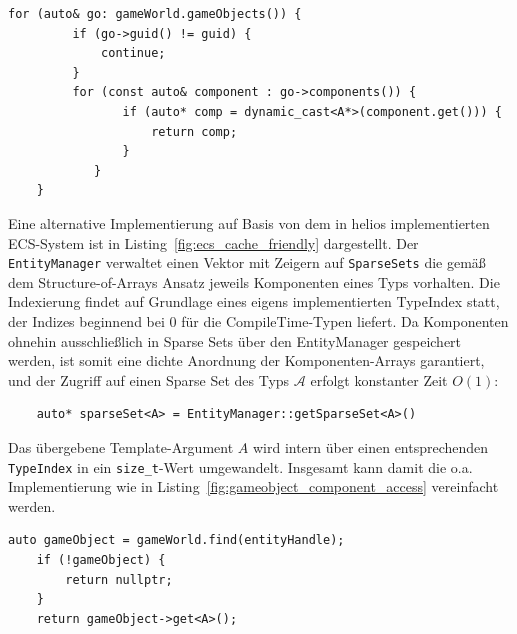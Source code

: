 \begin{lstlisting}[style=c++style,
    caption={Codebeispiel für die Iteration über alle GameObjects, um Komponenten eines bestimmten Typs $\mathcal{A}$ zu finden (Meilenstein 3). Die Implementierung begünstigt Cache Misses, da die angefragten Daten nicht in zusammenhängenden Speicherbereichen liegen.
Für den performancekritischen Hot Path in GameEngines entstehen zudem durch das \textit{Pointer Chasing} \texttt{world} $\rightarrow$ \texttt{gameobject} $\rightarrow$ \texttt{component}~\cite{HKSN+16} und den RTTI-cast unverhältnismäßig teure Operationen.},
    label=lst:gameobject_cache_miss]
    for (auto& go: gameWorld.gameObjects()) {
         if (go->guid() != guid) {
             continue;
         }
         for (const auto& component : go->components()) {
                if (auto* comp = dynamic_cast<A*>(component.get())) {
                    return comp;
                }
            }
    }
\end{lstlisting}

Eine alternative Implementierung auf Basis von dem in helios implementierten ECS-System ist in Listing~\ref{fig:ecs_cache_friendly} dargestellt.
Der \texttt{EntityManager} verwaltet einen Vektor mit Zeigern auf \texttt{SparseSets} die gemäß dem Structure-of-Arrays Ansatz jeweils Komponenten eines Typs vorhalten.
Die Indexierung findet auf Grundlage eines eigens implementierten TypeIndex statt, der Indizes beginnend bei $0$ für die CompileTime-Typen liefert.
Da Komponenten ohnehin ausschließlich in Sparse Sets über den EntityManager gespeichert werden, ist somit eine dichte Anordnung der Komponenten-Arrays garantiert, und der Zugriff auf einen Sparse Set des Typs $\mathcal{A}$ erfolgt konstanter Zeit $O(1)$:

\begin{verbatim}
    auto* sparseSet<A> = EntityManager::getSparseSet<A>()
\end{verbatim}

\noindent
Das übergebene Template-Argument $A$ wird intern über einen entsprechenden \texttt{TypeIndex} in ein \texttt{size\_t}-Wert umgewandelt.
Insgesamt kann damit die o.a. Implementierung wie in Listing~\ref{fig:gameobject_component_access} vereinfacht werden.


\begin{lstlisting}[style=c++style,
    caption={Zugriff auf eine Komponente eines GameObjects mit der ECS-Implementierung in helios (Meilenstein 5).},
    label=lst:gameobject_component_access]
    auto gameObject = gameWorld.find(entityHandle);
    if (!gameObject) {
        return nullptr;
    }
    return gameObject->get<A>();
\end{lstlisting}

